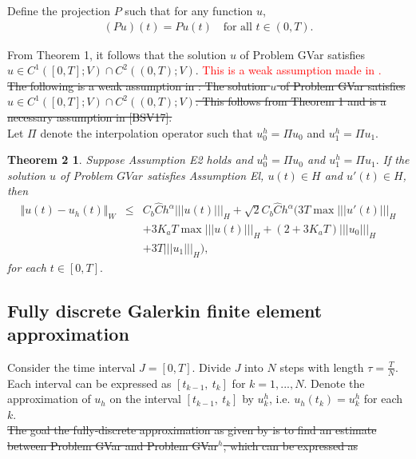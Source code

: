 \documentclass[../../main.tex]{subfiles}
\begin{document}
Define the projection $P$ such that for any function $u$,
\begin{eqnarray*}
	(Pu)(t) = Pu(t) \ \ \ \textrm{ for all } t \in (0,T).
\end{eqnarray*}



From Theorem 1, it follows that the solution $u$ of Problem GVar satisfies $u \in C^1([0,T]; V) \cap C^2((0,T);V)$. \textcolor{red}{This is a weak assumption made in \cite{BV13}.}\\

\sout{The following is a weak assumption in \cite{BV13}: The solution $u$ of Problem GVar satisfies $u \in C^1([0,T]; V) \cap C^2((0,T);V)$. This follows from Theorem 1 and is a necessary assumption in [BSV17].}\\

Let $\Pi$ denote the interpolation operator such that $u_0^h = \Pi u_0$ and $u_1^h = \Pi u_1$.

\newtheorem*{DC_Thm4}{Theorem 2}
\begin{DC_Thm4}
	Suppose Assumption E2 holds and $u_{0}^{h}=\Pi u_{0}$ and $u_{1}^{h}=\Pi u_{1}.$ If the solution $u$ of Problem $GVar$ satisfies Assumption El, $u(t)\in H$ and $u'(t)\in H$, then
	\begin{eqnarray*}
		\Vert u(t)-u_{h}(t)\Vert_{W} & \leq & C_{b} \hat{C}h^{\alpha}|||u(t)|||_{H}+\sqrt{2}C_{b}\hat{C}h^{\alpha}(3T\max|||u'(t)|||_{H}\\
		& & +3K_{a}T\max|||u(t)|||_{H}+(2+3K_{a}T)|||u_{0}|||_{H} \\
		& & +3T|||u_{1}|||_{H}) ,
	\end{eqnarray*} for each $t\in[0, T].$
\end{DC_Thm4}


\subsection{Fully discrete Galerkin finite element approximation}
Consider the time interval $J = [0,T]$. Divide $J$ into $N$ steps with length $\tau = \frac{T}{N}$. Each interval can be expressed as $[t_{k-1}, \ t_k]$ for $k = 1,...,N$. Denote the approximation of $u_h$ on the interval $[t_{k-1}, \ t_k]$ by $u_k^h$, i.e. $u_h(t_k) = u_k^h$ for each $k$.\\


\sout{The goal the fully-discrete approximation as given by \cite{BV13} is to find an estimate between Problem GVar and Problem GVar$^h$, which can be expressed as}
\end{document}
